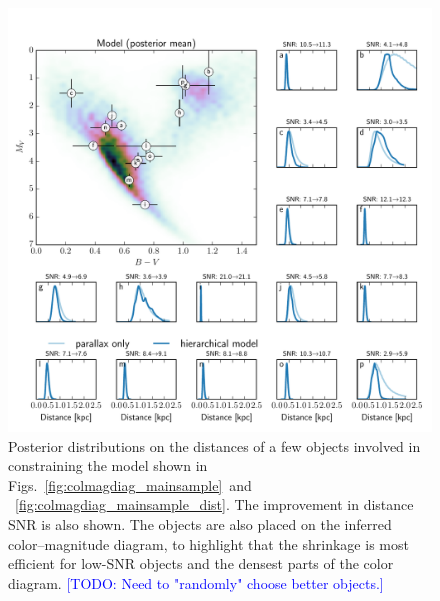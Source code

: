 \documentclass[manuscript, letterpaper]{aastex6}
\newcommand{\figrefs}[2]{{\xspace}Figs.~\ref{#1}~and ~\ref{#2}}
\newcommand{\todo}[1]{\textcolor{blue}{[TODO: #1]}}
\begin{document}
\begin{figure}
\hspace*{-2mm}\includegraphics[width=15.7cm]{model_dist_pdfs.pdf}
\caption{Posterior distributions on the distances of a few objects involved in constraining the model shown in \figrefs{fig:colmagdiag_mainsample}{fig:colmagdiag_mainsample_dist}. 
The improvement in distance SNR is also shown. The objects are also placed on the inferred color--magnitude diagram, to highlight that the shrinkage is most efficient for low-SNR objects and the densest parts of the color diagram. \todo{Need to "randomly" choose better objects.}}\label{fig:model_dist_pdfs}
\end{figure}
\end{document}
